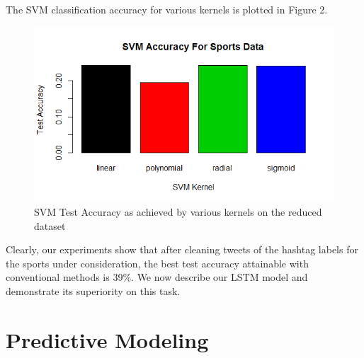 \documentclass[journal, a4paper]{IEEEtran}
\begin{document}
The SVM classification accuracy for various kernels is plotted in Figure 2.
\begin{figure}[!hbt]
	\centering
	\includegraphics[width=\columnwidth]{image02.png}
	\caption{SVM Test Accuracy as achieved by various kernels on the reduced dataset}
	\label{fig:2}
\end{figure}

Clearly, our experiments show that after cleaning tweets of the hashtag labels for the sports under consideration, the best test accuracy attainable with conventional methods is 39\%. We now describe our LSTM model and demonstrate its superiority on this task.

\section{Predictive Modeling}
\end{document}
